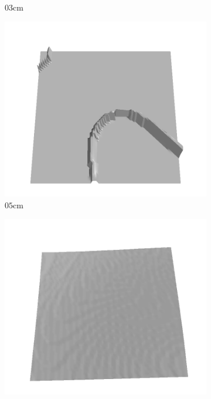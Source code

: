 \documentclass[../document.tex]{subfiles}
\begin{document}
\begin{figure}[htbp]
\begin{subfigure}[b]{0.19\textwidth}
    \caption{$03$cm}
    \end{subfigure}
    \begin{subfigure}[b]{0.19\textwidth}
    \includegraphics[width=\linewidth]{../img/5/train/all/05-patch-3d-majavi-8.png}
    \caption{$05$cm}
    \end{subfigure}
    \begin{subfigure}[b]{0.19\textwidth}
    \includegraphics[width=\linewidth]{../img/5/train/all/08-patch-3d-majavi-9.png}

\end{subfigure}
\end{figure}
\end{document}
